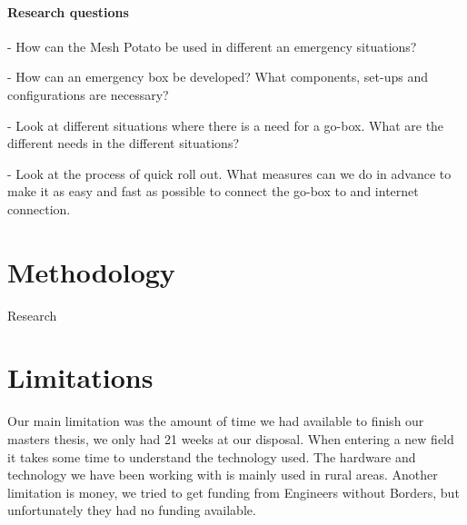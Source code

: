 \paragraph{Research questions}
- How can the Mesh Potato be used in different an emergency situations?

- How can an emergency box be developed? What components, set-ups and configurations are necessary?
 
- Look at different situations where there is a need for a go-box. What are the different needs in the different situations?

- Look at the process of quick roll out. What measures can we do in advance to make it as easy and fast as possible to connect the go-box to and internet connection.



\section{Methodology}
Research



\section{Limitations}
Our main limitation was the amount of time we had available to finish our masters thesis, we only had 21 weeks at our disposal. When entering a new field it takes some time to understand the technology used. 
The hardware and technology we have been working with is mainly used in rural areas. Another limitation is money, we tried to get funding from Engineers without Borders, but unfortunately they had no funding available.  


